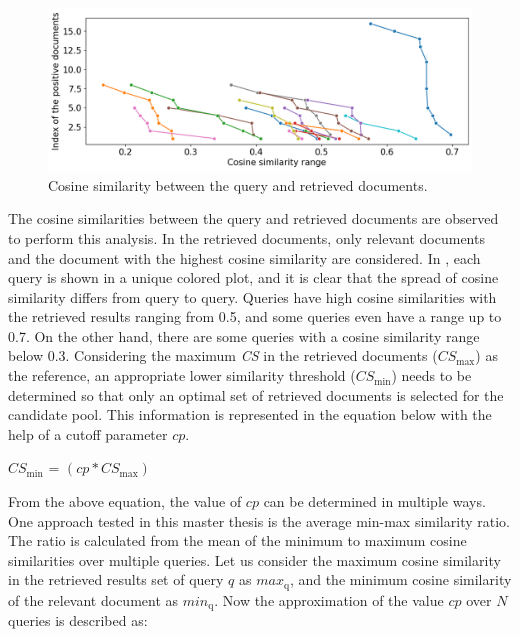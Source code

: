  
 \begin{figure}[h]
 	\centering
 	\includegraphics[width=.95\textwidth]{images/results/candidate_pool_analysis.png}
 	\caption[Cosine similarity distribution.]{Cosine similarity between the query and retrieved documents. \label{fig:cosine_sim_range}}
 \end{figure}
 
The cosine similarities between the query and retrieved documents are observed to perform this analysis. In the retrieved documents, only relevant documents and the document with the highest cosine similarity are considered. In , each query is shown in a unique colored plot, and it is clear that the spread of cosine similarity differs from query to query. Queries have high cosine similarities with the retrieved results ranging from 0.5, and some queries even have a range up to 0.7. On the other hand, there are some queries with a cosine similarity range below 0.3. Considering the maximum \textit{\ac{CS}} in the retrieved documents ($CS_{\mathrm{max}}$) as the reference, an appropriate lower similarity threshold ($CS_{\mathrm{min}}$) needs to be determined so that only an optimal set of retrieved documents is selected for the candidate pool. This information is represented in the equation below with the help of a cutoff parameter $cp$.
 \\
 
 	\centerline{$CS_{\mathrm{min}}$ = $( cp * CS_{\mathrm{max}} )$}
 	
 	
From the above equation, the value of $cp$ can be determined in multiple ways. One approach tested in this master thesis is the average min-max similarity ratio. The ratio is calculated from the mean of the minimum to maximum cosine similarities over multiple queries. Let us consider the maximum cosine similarity in the retrieved results set of query $q$ as $ max_{\mathrm{q}}$, and the minimum cosine similarity of the relevant document as $ min_{\mathrm{q}}$. Now the approximation of the value $cp$ over $N$ queries is described as:

